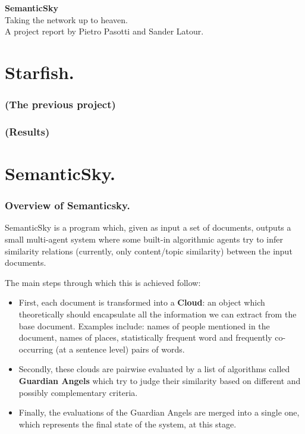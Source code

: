 \documentclass[11pt]{article}
\begin{document}
\begin{center}
\Huge{\textbf{SemanticSky}} \\ \large{Taking the network up to heaven.} \\\vspace{15pt} A project report by Pietro Pasotti and Sander Latour.
\end{center}

\tableofcontents
\clearpage

\part{Starfish.}

\section{(The previous project)}

\section{(Results)}



\part{SemanticSky.}

\section{Overview of Semanticsky.}

SemanticSky is a program which, given as input a set of documents, outputs a small multi-agent system where some built-in algorithmic agents try to infer similarity relations (currently, only content/topic similarity) between the input documents.

The main steps through which this is achieved follow:

\begin{itemize}
\item First, each document is transformed into a {\bf Cloud}: an object which theoretically should encapsulate all the information we can extract from the base document. Examples include: names of people mentioned in the document, names of places, statistically frequent word and frequently co-occurring (at a sentence level) pairs of words.
\item  Secondly, these clouds are pairwise evaluated by a list of algorithms called {\bf Guardian Angels} which try to judge their similarity based on different and possibly complementary criteria.
\item Finally, the evaluations of the Guardian Angels are merged into a single one, which represents the final state of the system, at this stage.
\end{itemize}
\end{document}
